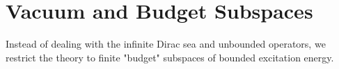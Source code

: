 \chapter{Vacuum and Budget Subspaces}
Instead of dealing with the infinite Dirac sea and unbounded operators, we restrict the theory to finite "budget" subspaces of bounded excitation energy. 
